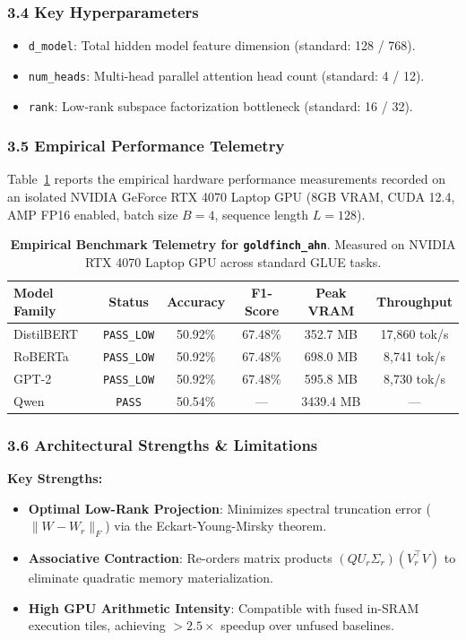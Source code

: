\subsubsection*{3.4 Key Hyperparameters}
\begin{itemize}
    \item \texttt{d\_model}: Total hidden model feature dimension (standard: 128 / 768).
    \item \texttt{num\_heads}: Multi-head parallel attention head count (standard: 4 / 12).
    \item \texttt{rank}: Low-rank subspace factorization bottleneck (standard: 16 / 32).
\end{itemize}

\subsubsection*{3.5 Empirical Performance Telemetry}
Table~\ref{tab:telemetry_goldfinch_ahn} reports the empirical hardware performance measurements recorded on an isolated NVIDIA GeForce RTX 4070 Laptop GPU (8GB VRAM, CUDA 12.4, AMP FP16 enabled, batch size $B=4$, sequence length $L=128$).

\begin{table}[h]
\centering
\small
\caption{\textbf{Empirical Benchmark Telemetry for \texttt{goldfinch\_ahn}}. Measured on NVIDIA RTX 4070 Laptop GPU across standard GLUE tasks.}
\label{tab:telemetry_goldfinch_ahn}
\begin{tabular*}{\columnwidth}{@{\extracolsep{\fill}}lccccc}
\toprule
\textbf{Model Family} & \textbf{Status} & \textbf{Accuracy} & \textbf{F1-Score} & \textbf{Peak VRAM} & \textbf{Throughput} \\
\midrule
DistilBERT & \texttt{PASS\_LOW} & 50.92\% & 67.48\% & 352.7 MB & 17,860 tok/s \\
RoBERTa & \texttt{PASS\_LOW} & 50.92\% & 67.48\% & 698.0 MB & 8,741 tok/s \\
GPT-2 & \texttt{PASS\_LOW} & 50.92\% & 67.48\% & 595.8 MB & 8,730 tok/s \\
Qwen & \texttt{PASS} & 50.54\% & --- & 3439.4 MB & --- \\
\bottomrule
\end{tabular*}
\end{table}

\subsubsection*{3.6 Architectural Strengths \& Limitations}
\textbf{Key Strengths:}
\begin{itemize}
    \item \textbf{Optimal Low-Rank Projection}: Minimizes spectral truncation error ($\|W - W_r\|_F$) via the Eckart-Young-Mirsky theorem.
    \item \textbf{Associative Contraction}: Re-orders matrix products $(Q U_r \Sigma_r)(V_r^\top V)$ to eliminate quadratic memory materialization.
    \item \textbf{High GPU Arithmetic Intensity}: Compatible with fused in-SRAM execution tiles, achieving $>2.5\times$ speedup over unfused baselines.
\end{itemize}

